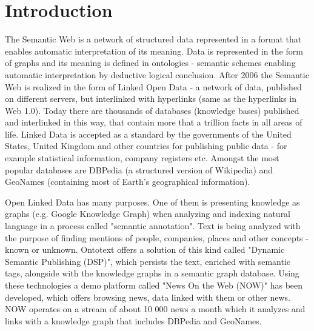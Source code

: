 \chapter{Introduction}
The Semantic Web is a network of structured data represented in a format that enables automatic interpretation of its meaning. Data is represented in the form of graphs and its meaning is defined in ontologies - semantic schemes enabling automatic interpretation by deductive logical conclusion. After 2006 the Semantic Web is realized in the form of Linked Open Data - a network of data, published on different servers, but interlinked with hyperlinks (same as the hyperlinks in Web 1.0). Today there are thousands of databases (knowledge bases) published and interlinked in this way, that contain more that a trillion facts in all areas of life. Linked Data is accepted as a standard by the governments of the United States, United Kingdom and other countries for publishing public data - for example statistical information, company registers etc. Amongst the most popular databases are DBPedia (a structured version of Wikipedia) and GeoNames (containing most of Earth's geographical information).

Open Linked Data has many purposes. One of them is presenting knowledge as graphs (e.g. Google Knowledge Graph) when analyzing and indexing natural language in a process called "semantic annotation". Text is being analyzed with the purpose of finding mentions of people, companies, places and other concepts - known or unknown. Ontotext offers a solution of this kind called "Dynamic Semantic Publishing (DSP)", which persists the text, enriched with semantic tags, alongside with the knowledge graphs in a semantic graph database. Using these technologies a demo platform called "News On the Web (NOW)" has been developed, which offers browsing news, data linked with them or other news. NOW operates on a stream of about 10 000 news a month which it analyzes and links with a knowledge graph that includes DBPedia and GeoNames.

